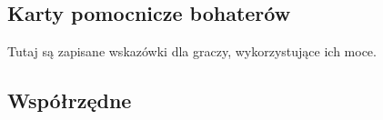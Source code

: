 	\subsection{Karty pomocnicze bohaterów}
		Tutaj są zapisane wskazówki dla graczy, wykorzystujące ich moce.

	\subsection{Współrzędne}
	\label{sec:wspolrzedne}
		\begin{multicols}{3}
		\end{multicols}

